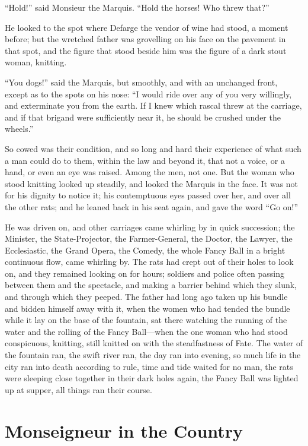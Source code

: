 ``Hold!'' said Monsieur the Marquis.  ``Hold the horses!  Who threw that?''

He looked to the spot where Defarge the vendor of wine had stood,
a moment before; but the wretched father was grovelling on his face
on the pavement in that spot, and the figure that stood beside him
was the figure of a dark stout woman, knitting.

``You dogs!'' said the Marquis, but smoothly, and with an unchanged front,
except as to the spots on his nose:  ``I would ride over any of you
very willingly, and exterminate you from the earth. If I knew which
rascal threw at the carriage, and if that brigand were sufficiently
near it, he should be crushed under the wheels.''

So cowed was their condition, and so long and hard their experience
of what such a man could do to them, within the law and beyond it,
that not a voice, or a hand, or even an eye was raised.  Among the
men, not one.  But the woman who stood knitting looked up steadily,
and looked the Marquis in the face.  It was not for his dignity to
notice it; his contemptuous eyes passed over her, and over all the
other rats; and he leaned back in his seat again, and gave the word
``Go on!''

He was driven on, and other carriages came whirling by in quick
succession; the Minister, the State-Projector, the Farmer-General,
the Doctor, the Lawyer, the Ecclesiastic, the Grand Opera, the
Comedy, the whole Fancy Ball in a bright continuous flow, came
whirling by.  The rats had crept out of their holes to look on,
and they remained looking on for hours; soldiers and police often
passing between them and the spectacle, and making a barrier behind
which they slunk, and through which they peeped.  The father had long
ago taken up his bundle and bidden himself away with it, when the
women who had tended the bundle while it lay on the base of the
fountain, sat there watching the running of the water and the rolling
of the Fancy Ball---when the one woman who had stood conspicuous,
knitting, still knitted on with the steadfastness of Fate.  The water
of the fountain ran, the swift river ran, the day ran into evening,
so much life in the city ran into death according to rule, time and
tide waited for no man, the rats were sleeping close together in
their dark holes again, the Fancy Ball was lighted up at supper,
all things ran their course.



\chapter{Monseigneur in the Country}


